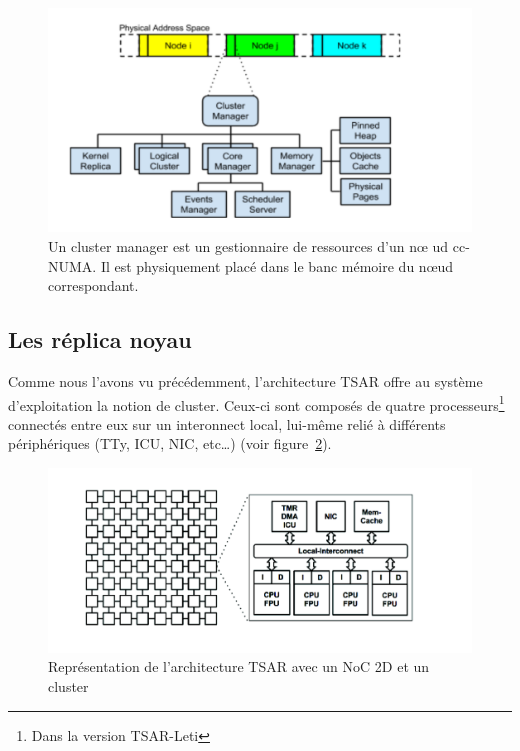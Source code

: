       \begin{figure}[!h]
        \centering \includegraphics[scale=0.16]{include/img/cluster_manager}
        \caption{Un cluster manager est un gestionnaire de ressources d'un n\oe
          ud cc-NUMA. Il est physiquement placé dans le banc mémoire du n\oe ud
          correspondant.}
        \label{fig:cluster_manager}
      \end{figure}

      
    \subsection{Les réplica noyau}

      Comme nous l'avons vu précédemment, l'architecture TSAR offre au système
      d'exploitation la notion de cluster. Ceux-ci sont composés de quatre
      processeurs\footnote{Dans la version TSAR-Leti} connectés entre eux sur un
      interonnect local, lui-même relié à différents périphériques (TTy, ICU,
      NIC, etc\ldots) (voir figure~\ref{fig:tsar_cluster}).
      
      \begin{figure}[!h]
        \centering \includegraphics[scale=0.17]{include/img/tsar_clusters.png}
        \caption{Représentation de l'architecture TSAR avec un NoC 2D et un
          cluster~\cite{almaless2014universite}}
        \label{fig:tsar_cluster}

      \end{figure}

